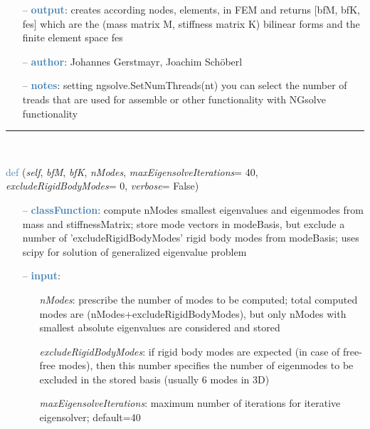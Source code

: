 \begin{itemize}[leftmargin=1.4cm]
\begin{itemize}[leftmargin=0.5cm]
\begin{itemize}[leftmargin=1.4cm]
\begin{itemize}[leftmargin=1.4cm]
\begin{itemize}[leftmargin=0.5cm]
\begin{itemize}[leftmargin=0.7cm]
\begin{itemize}[leftmargin=1.2cm]
  \end{itemize}
  \item[--]  \textcolor{steelblue}{\bf output}: creates according nodes, elements, in FEM and returns [bfM, bfK, fes] which are the (mass matrix M, stiffness matrix K) bilinear forms and the finite element space fes  \item[--]  \textcolor{steelblue}{\bf author}: Johannes Gerstmayr, Joachim Sch\"oberl  \item[--]  \textcolor{steelblue}{\bf notes}: setting ngsolve.SetNumThreads(nt) you can select the number of treads that are used for assemble or other functionality with NGsolve functionality\vspace{12pt}\end{itemize}
%
\noindent\rule{8cm}{0.75pt}\vspace{1pt} \\ 
\begin{flushleft}
\noindent \textcolor{steelblue}{def {\bf {}}}\label{sec:FEM:FEMinterface:ComputeEigenmodesNGsolve}
({\it self}, {\it bfM}, {\it bfK}, {\it nModes}, {\it maxEigensolveIterations}= 40, {\it excludeRigidBodyModes}= 0, {\it verbose}= False)
\end{flushleft}
\setlength{\itemindent}{0.7cm}
\begin{itemize}[leftmargin=0.7cm]
  \item[--]  \textcolor{steelblue}{\bf classFunction}: compute nModes smallest eigenvalues and eigenmodes from mass and stiffnessMatrix; store mode vectors in modeBasis, but exclude a number of 'excludeRigidBodyModes' rigid body modes from modeBasis; uses scipy for solution of generalized eigenvalue problem  \item[--]  \textcolor{steelblue}{\bf input}: \vspace{-6pt}
  \begin{itemize}[leftmargin=1.2cm]
\setlength{\itemindent}{-0.7cm}
    \item[] {\it nModes}: prescribe the number of modes to be computed; total computed modes are  (nModes+excludeRigidBodyModes), but only nModes with smallest absolute eigenvalues are considered and stored
    \item[] {\it   excludeRigidBodyModes}: if rigid body modes are expected (in case of free-free modes), then this number specifies the number of eigenmodes to be excluded in the stored basis (usually 6 modes in 3D)
    \item[] {\it   maxEigensolveIterations}: maximum number of iterations for iterative eigensolver; default=40

\end{itemize}
\end{itemize}
\end{itemize}
\end{itemize}
\end{itemize}
\end{itemize}
\end{itemize}
